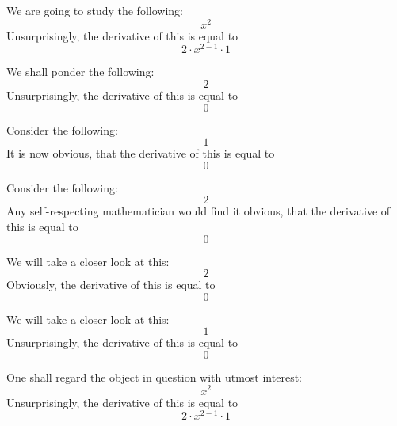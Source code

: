 \documentclass{article}
\begin{document}
We are going to study the following:
\begin{equation}
x ^{2 } 
\end{equation}
Unsurprisingly, the derivative of this is equal to
\begin{equation}
2 \cdot x ^{2 - 1 } \cdot 1 
\end{equation}

We shall ponder the following:
\begin{equation}
2 
\end{equation}
Unsurprisingly, the derivative of this is equal to
\begin{equation}
0 
\end{equation}

Consider the following:
\begin{equation}
1 
\end{equation}
It is now obvious, that the derivative of this is equal to
\begin{equation}
0 
\end{equation}

Consider the following:
\begin{equation}
2 
\end{equation}
Any self-respecting mathematician would find it obvious, that the derivative of this is equal to
\begin{equation}
0 
\end{equation}

We will take a closer look at this:
\begin{equation}
2 
\end{equation}
Obviously, the derivative of this is equal to
\begin{equation}
0 
\end{equation}

We will take a closer look at this:
\begin{equation}
1 
\end{equation}
Unsurprisingly, the derivative of this is equal to
\begin{equation}
0 
\end{equation}

One shall regard the object in question with utmost interest:
\begin{equation}
x ^{2 } 
\end{equation}
Unsurprisingly, the derivative of this is equal to
\begin{equation}
2 \cdot x ^{2 - 1 } \cdot 1 
\end{equation}
\end{document}
